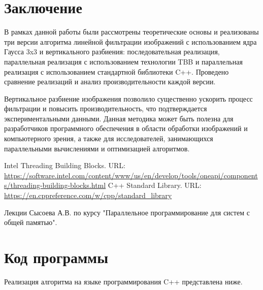 \documentclass{report}
\begin{document}
\newpage


\section*{Заключение}
\par В рамках данной работы были рассмотрены теоретические основы и реализованы три версии алгоритма линейной фильтрации изображений с использованием ядра Гаусса 3x3 и вертикального разбиения: последовательная реализация, параллельная реализация с использованием технологии TBB и параллельная реализация с использованием стандартной библиотеки C++. Проведено сравнение реализаций и анализ производительности каждой версии.
\par Вертикальное разбиение изображения позволило существенно ускорить процесс фильтрации и повысить производительность, что подтверждается экспериментальными данными. Данная методика может быть полезна для разработчиков программного обеспечения в области обработки изображений и компьютерного зрения, а также для исследователей, занимающихся параллельными вычислениями и оптимизацией алгоритмов.

\newpage
\begin{thebibliography}{1}
 Intel Threading Building Blocks. URL: \url{https://software.intel.com/content/www/us/en/develop/tools/oneapi/components/threading-building-blocks.html}
 C++ Standard Library. URL: \url{https://en.cppreference.com/w/cpp/standard_library}
\item Лекции Сысоева А.В. по курсу "Параллельное программирование для систем с общей памятью".
\end{thebibliography}

\newpage

\section*{Код программы}
\par Реализация алгоритма на языке программирования C++ представлена ниже.
\end{document}
